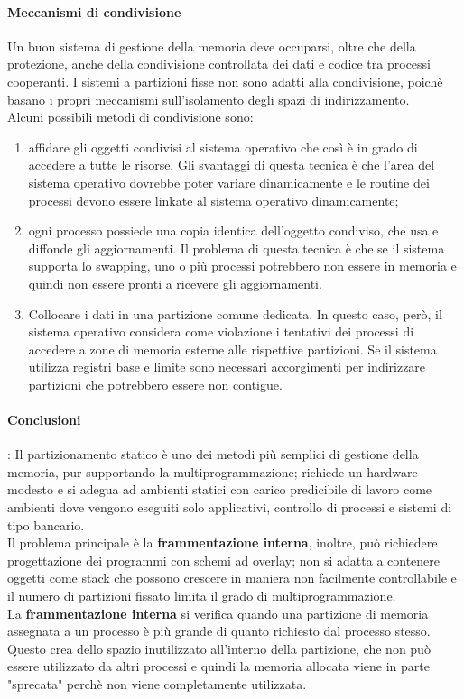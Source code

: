\documentclass[12pt, letterpaper]{report}
\begin{document}
	\paragraph{Meccanismi di condivisione} Un buon sistema di gestione della memoria deve occuparsi, oltre che della protezione, anche della condivisione controllata dei dati e codice tra processi cooperanti. I sistemi a partizioni fisse non sono adatti alla condivisione, poichè basano i propri meccanismi sull'isolamento degli spazi di indirizzamento. \\
	Alcuni possibili metodi di condivisione sono:
	\begin{enumerate}
		\item affidare gli oggetti condivisi al sistema operativo che così è in grado di accedere a tutte le risorse. Gli svantaggi di questa tecnica è che l'area del sistema operativo dovrebbe poter variare dinamicamente e le routine dei processi devono essere linkate al sistema operativo dinamicamente;
		\item ogni processo possiede una copia identica dell'oggetto condiviso, che usa e diffonde gli aggiornamenti. Il problema di questa tecnica è che se il sistema supporta lo swapping, uno o più processi potrebbero non essere in memoria e quindi non essere pronti a ricevere gli aggiornamenti.
		\item Collocare i dati in una partizione comune dedicata. In questo caso, però, il sistema operativo considera come violazione i tentativi dei processi di accedere a zone di memoria esterne alle rispettive partizioni. Se il sistema utilizza registri base e limite sono necessari accorgimenti per indirizzare partizioni che potrebbero essere non contigue.
	\end{enumerate}
	\paragraph{Conclusioni}:
	Il partizionamento statico è uno dei metodi più semplici di gestione della memoria, pur supportando la multiprogrammazione; richiede un hardware modesto e si adegua ad ambienti statici con carico predicibile di lavoro come ambienti dove vengono eseguiti solo applicativi, controllo di processi e sistemi di tipo bancario. \\
	Il problema principale è la \textbf{frammentazione interna}, inoltre, può richiedere progettazione dei programmi con schemi ad overlay; non si adatta a contenere oggetti come stack che possono crescere in maniera non facilmente controllabile e il numero di partizioni fissato limita il grado di multiprogrammazione. \\
	La \textbf{frammentazione interna} si verifica quando una partizione di memoria assegnata a un processo è più grande di quanto richiesto dal processo stesso. Questo crea dello spazio inutilizzato all'interno della partizione, che non può essere utilizzato da altri processi e quindi la memoria allocata viene in parte "sprecata" perchè non viene completamente utilizzata.
\end{document}
